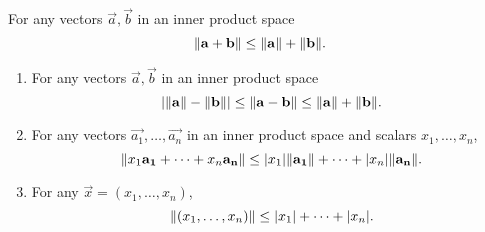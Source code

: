 \documentclass{article}
\begin{document}
\begin{theorem}
    For any vectors $\vec{a}, \vec{b}$ in an inner product space
    \begin{equation}
        \lVert\mathbf{a} + \mathbf{b}\rVert \leq \lVert\mathbf{a}\rVert + \lVert\mathbf{b}\rVert.
    \end{equation}
\end{theorem}
\begin{corollary}
    \begin{enumerate}
        \item For any vectors $\vec{a}, \vec{b}$ in an inner product space
              \begin{equation}
                  \lvert\lVert \mathbf{a}\rVert - \lVert \mathbf{b}\rVert\rvert \leq \lVert\mathbf{a} - \mathbf{b}\rVert \leq \lVert\mathbf{a}\rVert + \lVert \mathbf{b}\rVert.
              \end{equation}
        \item For any vectors $\vec{a_1}, \ldots, \vec{a_n}$ in an inner product space and scalars $x_1, \ldots, x_n$,
              \begin{equation}
                  \lVert x_1\mathbf{a_1} + \cdots + x_n\mathbf{a_n}\rVert \leq |x_1| \lVert\mathbf{a_1}\rVert + \cdots + \lvert x_n\rvert\lVert\mathbf{a_n}\rVert.
              \end{equation}
        \item For any $\vec{x} = (x_1, \ldots, x_n)$,
              \begin{equation}
                  \lVert(x_1, \ldots, x_n)\rVert \leq \lvert x_1\rvert + \cdots + \lvert x_n\rvert.
              \end{equation}
    \end{enumerate}
\end{corollary}
\end{document}
